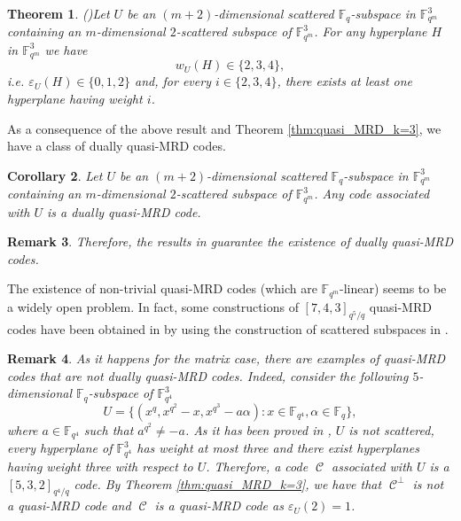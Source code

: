 \documentclass[11pt]{amsart}
\DeclareMathOperator{\C}{\mathcal{C}}
\newtheorem{theorem}{Theorem}[section]
\newtheorem{corollary}[theorem]{Corollary}
\newtheorem{remark}[theorem]{Remark}
\newcommand{\fqm}{\mathbb{F}_{q^m}}
\newcommand{\F}{{\mathbb F}}
\newcommand{\fq}{{\mathbb F}_{q}}
\begin{document}
\begin{theorem}(\cite[Theorem 5.2]{lia2024short})\label{thm:boundweightLLMT}
    Let $U$ be an $(m+2)$-dimensional scattered $\fq$-subspace in $\fqm^3$ containing an $m$-dimensional $2$-scattered subspace of $\fqm^3$. 
    For any hyperplane $H$ in $\fqm^3$ we have
    \[ w_U(H) \in \{2,3,4\},\]
    i.e. $\varepsilon_U(H)\in \{0,1,2\}$
    and, for every $i \in \{2,3,4\}$, there exists at least one hyperplane having weight $i$.
\end{theorem}

As a consequence of the above result and Theorem \ref{thm:quasi_MRD_k=3}, we have a class of dually quasi-MRD codes.

\begin{corollary}
    Let $U$ be an $(m+2)$-dimensional scattered $\fq$-subspace in $\fqm^3$ containing an $m$-dimensional $2$-scattered subspace of $\fqm^3$. Any code associated with $U$ is a dually quasi-MRD code.
\end{corollary}

\begin{remark}
    Therefore, the results in \cite[Theorem 3.5 and Corollary 3.9]{lia2024short} guarantee the existence of dually quasi-MRD codes.
\end{remark}

The existence of non-trivial quasi-MRD codes (which are $\fqm$-linear) seems to be a widely open problem. In fact, some constructions of  $[7,4,3]_{q^5/q}$ quasi-MRD codes have been obtained in \cite[Corollary 6.9]{marino2023evasive} by using the construction of scattered subspaces in \cite[Theorem 5.1]{bartoli2021evasive}.

\begin{remark}
    As it happens for the matrix case, there are examples of quasi-MRD codes that are not dually quasi-MRD codes. Indeed, consider the following $5$-dimensional $\fq$-subspace of $\F_{q^4}^3$
    \[ U=\{(x^q,x^{q^2}-x,x^{q^3}-a\alpha)\colon x \in\F_{q^4},\alpha \in \fq\}, \]
    where $a \in \F_{q^4}$ such that $a^{q^2}\ne -a$. 
    As it has been proved in \cite[Case ($B_3$)]{bonoli2005fq}, $U$ is not scattered,  every hyperplane of $\F_{q^4}^3$ has weight at most three and there exist hyperplanes having weight three with respect to $U$. Therefore,   a code $\C$ associated with $U$ is a  $[5,3,2]_{q^4/q}$ code. By Theorem \ref{thm:quasi_MRD_k=3}, we have that $\C^{\perp}$ is not a quasi-MRD code and $\C$ is a quasi-MRD code as $\varepsilon_U(2)=1$.
\end{remark}
\end{document}

